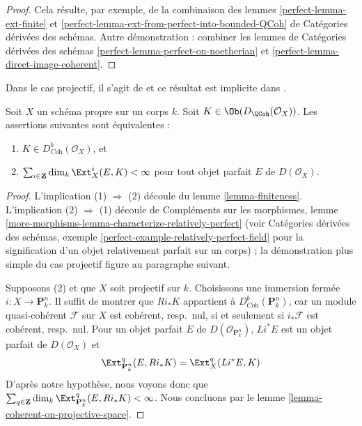 \begin{proof}
Cela résulte, par exemple, de la combinaison des
lemmes \ref{perfect-lemma-ext-finite} et
\ref{perfect-lemma-ext-from-perfect-into-bounded-QCoh} de Catégories dérivées des schémas.
Autre démonstration : combiner
les lemmes de Catégories dérivées des schémas
\ref{perfect-lemma-perfect-on-noetherian} et
\ref{perfect-lemma-direct-image-coherent}.
\end{proof}

\begin{lemma}
\label{lemma-characterize-dbcoh-projective}
\begin{reference}
Dans le cas projectif, il s'agit de \cite[Lemme 7.46]{Rouquier-dimensions}
et ce résultat est implicite dans \cite[Théorème A.1]{BvdB}.
\end{reference}
Soit $X$ un schéma propre sur un corps $k$. Soit
$K \in \Ob(D_\QCoh(\mathcal{O}_X))$. Les assertions suivantes sont équivalentes :
\begin{enumerate}
\item $K \in D^b_{\textit{Coh}}(\mathcal{O}_X)$, et
\item $\sum_{i \in \mathbf{Z}} \dim_k \Ext^i_X(E, K) < \infty$
pour tout objet parfait $E$ de $D(\mathcal{O}_X)$.
\end{enumerate}
\end{lemma}

\begin{proof}
L'implication (1) $\Rightarrow$ (2) découle du
lemme \ref{lemma-finiteness}.
L'implication (2) $\Rightarrow$ (1) découle de
Compléments sur les morphismes, lemme
\ref{more-morphisms-lemma-characterize-relatively-perfect}
(voir Catégories dérivées des schémas, exemple
\ref{perfect-example-relatively-perfect-field}
pour la signification d'un objet relativement parfait sur un corps) ;
la démonstration plus simple du cas projectif figure au paragraphe suivant.

\medskip\noindent
Supposons (2) et que $X$ soit projectif sur $k$.
Choisissons une immersion fermée $i : X \to \mathbf{P}^n_k$. Il suffit de montrer
que $Ri_*K$ appartient à $D^b_{\textit{Coh}}(\mathbf{P}^n_k)$, car un module quasi-cohérent
$\mathcal{F}$ sur $X$ est cohérent, resp.\ nul, si et seulement si
$i_*\mathcal{F}$ est cohérent, resp.\ nul. Pour un objet parfait $E$
de $D(\mathcal{O}_{\mathbf{P}^n_k})$, $Li^*E$ est un objet parfait de
$D(\mathcal{O}_X)$ et
$$
\Ext^q_{\mathbf{P}^n_k}(E, Ri_*K) = \Ext^q_X(Li^*E, K)
$$
D'après notre hypothèse, nous voyons donc que
$\sum_{q \in \mathbf{Z}} \dim_k \Ext^q_{\mathbf{P}^n_k}(E, Ri_*K) < \infty$.
Nous concluons par le lemme \ref{lemma-coherent-on-projective-space}.
\end{proof}





